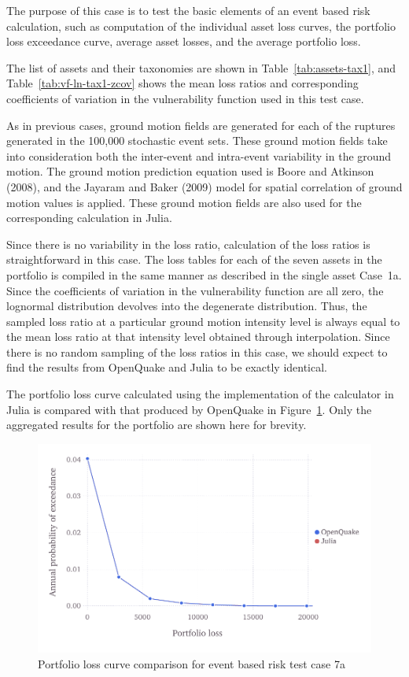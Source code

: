 The purpose of this case is to test the basic elements of an event based risk calculation, such as computation of the individual asset loss curves, the portfolio loss exceedance curve, average asset losses, and the average portfolio loss.

The list of assets and their taxonomies are shown in Table~\ref{tab:assets-tax1}, and Table~\ref{tab:vf-ln-tax1-zcov} shows the mean loss ratios and corresponding coefficients of variation in the vulnerability function used in this test case.

As in previous cases, ground motion fields are generated for each of the ruptures generated in the 100,000 stochastic event sets. These ground motion fields take into consideration both the inter-event and intra-event variability in the ground motion. The ground motion prediction equation used is Boore and Atkinson (2008), and the Jayaram and Baker (2009) model for spatial correlation of ground motion values is applied. These ground motion fields are also used for the corresponding calculation in Julia.

Since there is no variability in the loss ratio, calculation of the loss ratios is straightforward in this case. The loss tables for each of the seven assets in the portfolio is compiled in the same manner as described in the single asset Case~1a. Since the coefficients of variation in the vulnerability function are all zero, the lognormal distribution devolves into the degenerate distribution. Thus, the sampled loss ratio at a particular ground motion intensity level is always equal to the mean loss ratio at that intensity level obtained through interpolation. Since there is no random sampling of the loss ratios in this case, we should expect to find the results from OpenQuake and Julia to be exactly identical.

The portfolio loss curve calculated using the implementation of the calculator in Julia is compared with that produced by OpenQuake in Figure~\ref{fig:lc-ebr-7a}. Only the aggregated results for the portfolio are shown here for brevity.

\begin{figure}[htbp]
\centering
\includegraphics[width=12cm]{qareport/figures/fig-lc-ebr-7a}
\caption{Portfolio loss curve comparison for event based risk test case 7a}
\label{fig:lc-ebr-7a}
\end{figure}